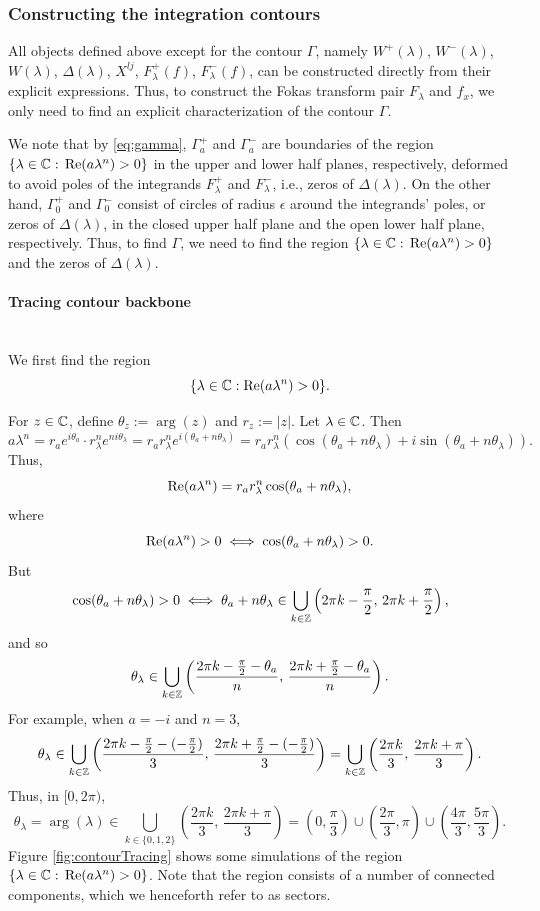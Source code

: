 \documentclass[12pt, oneside, a4paper]{article}
\begin{document}
\subsubsection{Constructing the integration contours}\label{sec:constructing_contours}
All objects defined above except for the contour $\Gamma$, namely $W^+(\lambda)$, $W^-(\lambda)$, $W(\lambda)$, $\Delta(\lambda)$, $X^{lj}$, $F^+_\lambda(f)$, $F^-_\lambda(f)$, can be constructed directly from their explicit expressions. Thus, to construct the Fokas transform pair $F_\lambda$ and $f_x$, we only need to find an explicit characterization of the contour $\Gamma$.


We note that by \eqref{eq:gamma}, $\Gamma_a^+$ and $\Gamma_a^-$ are boundaries of the region $\{\lambda\in\mathbb C:\, \mathrm{Re}(a\lambda^n)>0\}$ in the upper and lower half planes, respectively, deformed to avoid poles of the integrands $F^+_\lambda$ and $F^-_\lambda$, i.e., zeros of $\Delta(\lambda)$. On the other hand, $\Gamma_0^+$ and $\Gamma_0^-$ consist of circles of radius $\epsilon$ around the integrands' poles, or zeros of $\Delta(\lambda)$, in the closed upper half plane and the open lower half plane, respectively. Thus, to find $\Gamma$, we need to find the region $\{\lambda\in\mathbb C:\, \mathrm{Re}(a\lambda^n)>0\}$ and the zeros of $\Delta(\lambda)$.

\paragraph{Tracing contour backbone}\mbox{}\label{par:tracing_contour_sectors}\\
We first find the region
\[\{\lambda\in\mathbb C: \mathrm{Re}(a\lambda^n)>0\}.\]

For $z\in\mathbb C$, define $\theta_z:=\arg(z)$ and $r_z:=|z|$.
Let $\lambda\in\mathbb C$. Then
\[a\lambda^n = r_ae^{i\theta_a}\cdot r_\lambda^n e^{ni\theta_\lambda} = r_a r_\lambda^n e^{i(\theta_a+n\theta_\lambda)} = r_ar_\lambda^n(\cos(\theta_a+n\theta_\lambda) + i\sin(\theta_a+n\theta_\lambda)).\]
Thus,
\[\mathrm{Re}(a\lambda^n) = r_ar_\lambda^n \cos(\theta_a+n\theta_\lambda),\]
where
\[\mathrm{Re}(a\lambda^n)>0 \iff \cos(\theta_a+n\theta_\lambda)>0.\]
But
\[\cos(\theta_a+n\theta_\lambda)>0 \iff \theta_a+n\theta_\lambda\in \bigcup_{k\in\mathbb Z}\left(2\pi k -\frac{\pi}{2},\,2\pi k + \frac{\pi}{2}\right),\]
and so
\[\theta_\lambda\in \bigcup_{k\in\mathbb Z}\left(\frac{2\pi k -\frac{\pi}{2}-\theta_a}{n},\,\frac{2\pi k + \frac{\pi}{2}-\theta_a}{n}\right).\]
For example, when $a=-i$ and $n=3$,
\[\theta_\lambda\in \bigcup_{k\in\mathbb Z}\left(\frac{2\pi k -\frac{\pi}{2}-(-\frac{\pi}{2})}{3},\,\frac{2\pi k + \frac{\pi}{2}-(-\frac{\pi}{2})}{3}\right) = \bigcup_{k\in\mathbb Z}\left(\frac{2\pi k}{3},\,\frac{2\pi k + \pi}{3}\right).\]
Thus, in $[0,2\pi)$,
\[\theta_\lambda=\arg(\lambda)\in \bigcup_{k\in\{0,1,2\}}\left(\frac{2\pi k}{3},\,\frac{2\pi k + \pi}{3}\right) = \left(0,\frac{\pi}{3}\right)\cup \left(\frac{2\pi}{3}, \pi\right)\cup \left(\frac{4\pi}{3}, \frac{5\pi}{3}\right).\]
Figure \ref{fig:contourTracing} shows some simulations of the region $\{\lambda\in\mathbb C:\,\mathrm{Re}(a\lambda^n)>0\}$. Note that the region consists of a number of connected components, which we henceforth refer to as sectors.
\end{document}
